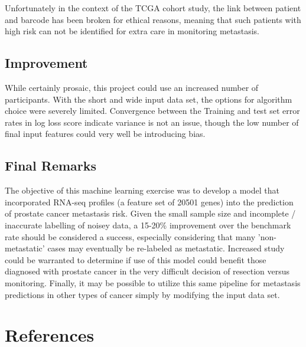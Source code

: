 \documentclass[final]{article}
\begin{document}
Unfortunately in the context of the TCGA cohort study, the link between patient
and barcode has been broken for ethical reasons, meaning that such patients with
high risk can not be identified for extra care in monitoring metastasis.

\subsection{Improvement}

While certainly prosaic, this project could use an increased number of participants.
With the short and wide input data set, the options for algorithm choice were severely
limited.  Convergence between the Training and test set error rates in log loss
score indicate variance is not an issue, though the low number of final input features
could very well be introducing bias.

\subsection{Final Remarks}

The objective of this machine learning exercise was to develop a model that
incorporated RNA-seq profiles (a feature set of 20501 genes) into the
prediction of prostate cancer metastasis risk.  Given the small sample size and
incomplete / inaccurate labelling of noisey data, a 15-20\% improvement over the
benchmark rate should be  considered a success, especially considering that many
'non-metastatic' cases may eventually be re-labeled as metastatic.  Increased study could
be warranted to  determine if use of this model could benefit those diagnosed
with prostate cancer in the very difficult decision of resection versus
monitoring.  Finally, it may be possible to utilize this same pipeline for
metastasis predictions in other types of cancer simply by modifying the input data set.

\section{References}
\end{document}
